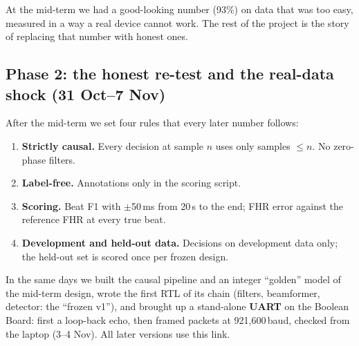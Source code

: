 \documentclass[11pt]{article}
\begin{document}
\begin{lesson}
At the mid-term we had a good-looking number (93\%) on data that was too easy, measured in a way a real device cannot work. The rest of the project is the story of replacing that number with honest ones.
\end{lesson}

\subsection{Phase 2: the honest re-test and the real-data shock (31 Oct--7 Nov)}
\label{sec:shock}
After the mid-term we set four rules that every later number follows:
\begin{enumerate}
  \item \textbf{Strictly causal.} Every decision at sample $n$ uses only samples $\le n$. No zero-phase filters.
  \item \textbf{Label-free.} Annotations only in the scoring script.
  \item \textbf{Scoring.} Beat F1 with $\pm$50\,ms from 20\,s to the end; FHR error against the reference FHR at every true beat.
  \item \textbf{Development and held-out data.} Decisions on development data only; the held-out set is scored once per frozen design.
\end{enumerate}

In the same days we built the causal pipeline and an integer ``golden'' model of the mid-term design, wrote the first RTL of its chain (filters, beamformer, detector: the ``frozen v1''), and brought up a stand-alone \textbf{UART} on the Boolean Board: first a loop-back echo, then framed packets at 921,600\,baud, checked from the laptop (3--4 Nov). All later versions use this link.

\begin{tried}
\end{tried}
\end{document}
